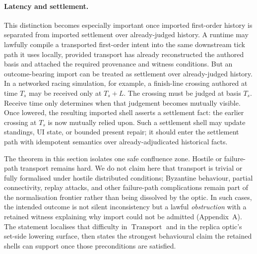 \documentclass{aion}
\begin{document}
	\paragraph{Latency and settlement.}
	This distinction becomes especially important once imported first-order history is
	separated from imported settlement over already-judged history. A runtime may
		lawfully compile a transported first-order intent into the same downstream tick
		path it uses locally, provided transport has already reconstructed the authored
	basis and attached the required provenance and witness conditions. But an
	outcome-bearing import can be treated as settlement over already-judged history. In a
	networked racing simulation, for example, a finish-line crossing authored at
	time \(T_s\) may be received only at \(T_s + L\). The crossing must be judged
	at basis \(T_s\). Receive time only determines when that judgement becomes
	mutually visible. Once lowered, the resulting imported shell asserts a
	settlement fact: the earlier crossing at \(T_s\) is now mutually relied upon.
	Such a settlement shell may update standings, UI state, or bounded present
	repair; it should enter the settlement path with idempotent semantics over
	already-adjudicated historical facts.

	The theorem in this section isolates one safe confluence zone. Hostile or failure-path
	transport remains hard. We do not claim here that transport is trivial or fully
	formalised under hostile distributed conditions; Byzantine behaviour, partial
	connectivity, replay attacks, and other failure-path complications remain part
	of the normalisation frontier rather than being dissolved by the optic.
	In such cases, the intended outcome is not silent inconsistency but a lawful
	\emph{obstruction} with a retained witness explaining why import could not be
	admitted (Appendix~A).
	The statement localises that difficulty in
	\(\operatorname{Transport}\) and in the replica optic's set-side lowering
	surface, then states the strongest behavioural claim the retained shells can
	support once those preconditions are satisfied.
\end{document}
